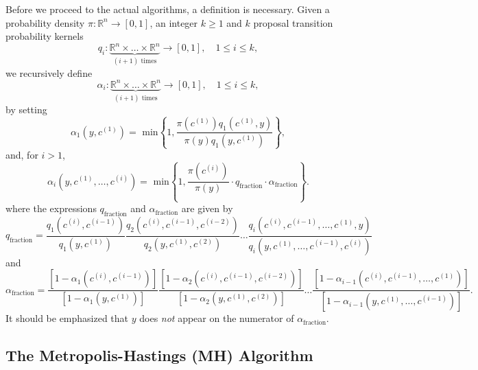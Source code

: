 Before we proceed to the actual algorithms, a definition is necessary.
Given a probability density $\pi:\mathbb{R}^n\rightarrow [0,1]$,
an integer $k\geqslant 1$ and
$k$ proposal transition probability kernels
\begin{equation*}
q_i:\underbrace{\mathbb{R}^n\times\ldots\times\mathbb{R}^n}_{(i+1)\mbox{ times}}\rightarrow [0,1],\quad 1\leqslant i\leqslant k,
\end{equation*}
we recursively define
\begin{equation}\label{eq-alphas}
\alpha_i:\underbrace{\mathbb{R}^n\times\ldots\times\mathbb{R}^n}_{(i+1)\mbox{ times}}\rightarrow [0,1],\quad 1\leqslant i\leqslant k,
\end{equation}
by setting
\begin{equation*}
\alpha_1(y,c^{(1)}) = \mbox{ min}
\left\{
1,\frac
{\pi(c^{(1)})q_1(c^{(1)},y)}
{\pi(y)q_1(y,c^{(1)})}
\right\},
\end{equation*}
and, for $i>1$,
\begin{equation*}
\alpha_i(y,c^{(1)},\ldots,c^{(i)}) = \mbox{ min}
\left\{
1,\frac
{\pi(c^{(i)})}
{\pi(y)}
\cdot q_{\mbox{fraction}}
\cdot \alpha_{\mbox{fraction}}
\right\}.
\end{equation*}
where
the expressions $q_{\mbox{fraction}}$ and $\alpha_{\mbox{fraction}}$ are given by
\begin{equation*}
q_{\mbox{fraction}}=
\frac
{q_1(c^{(i)},c^{(i-1)})}
{q_1(y,c^{(1)})}
\frac
{q_2(c^{(i)},c^{(i-1)},c^{(i-2)})}
{q_2(y,c^{(1)},c^{(2)})}
\ldots
\frac
{q_i(c^{(i)},c^{(i-1)},\ldots,c^{(1)},y)}
{q_i(y,c^{(1)},\ldots,c^{(i-1)},c^{(i)})}
\end{equation*}
and
\begin{equation*}
\alpha_{\mbox{fraction}}=
\frac
{[1-\alpha_1(c^{(i)},c^{(i-1)})]}
{[1-\alpha_1(y,c^{(1)})]}
\frac
{[1-\alpha_2(c^{(i)},c^{(i-1)},c^{(i-2)})]}
{[1-\alpha_2(y,c^{(1)},c^{(2)})]}
\ldots
\frac
{[1-\alpha_{i-1}(c^{(i)},c^{(i-1)},\ldots,c^{(1)})]}
{[1-\alpha_{i-1}(y,c^{(1)},\ldots,c^{(i-1)})]}.
\end{equation*}
It should be emphasized that $y$ does {\it not} appear on the numerator of $\alpha_{\mbox{fraction}}$.

\subsection{The Metropolis-Hastings (MH) Algorithm}%

